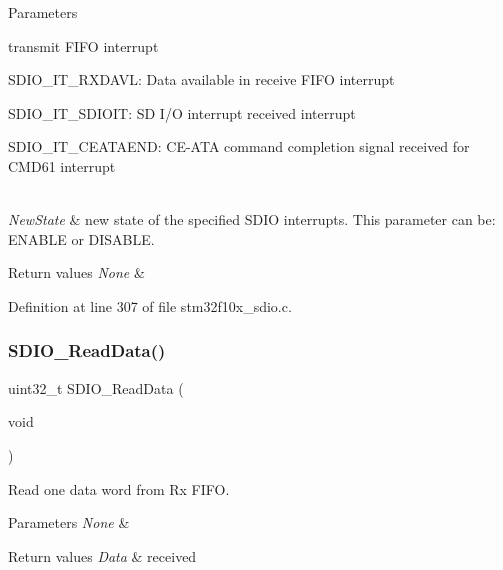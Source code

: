 \begin{DoxyParams}{Parameters}
\begin{DoxyItemize}
transmit F\+I\+FO interrupt \item S\+D\+I\+O\+\_\+\+I\+T\+\_\+\+R\+X\+D\+A\+VL\+: Data available in receive F\+I\+FO interrupt \item S\+D\+I\+O\+\_\+\+I\+T\+\_\+\+S\+D\+I\+O\+IT\+: SD I/O interrupt received interrupt \item S\+D\+I\+O\+\_\+\+I\+T\+\_\+\+C\+E\+A\+T\+A\+E\+ND\+: C\+E-\/\+A\+TA command completion signal received for C\+M\+D61 interrupt \end{DoxyItemize}
\\
\hline
{\em New\+State} & new state of the specified S\+D\+IO interrupts. This parameter can be\+: E\+N\+A\+B\+LE or D\+I\+S\+A\+B\+LE. \\
\hline
\end{DoxyParams}

\begin{DoxyRetVals}{Return values}
{\em None} & \\
\hline
\end{DoxyRetVals}


Definition at line 307 of file stm32f10x\+\_\+sdio.\+c.

\mbox{\label{group___s_d_i_o___exported___functions_ga4e8ac755ef3c31ecd4ed2708df19187e}} 
\subsubsection{\texorpdfstring{S\+D\+I\+O\+\_\+\+Read\+Data()}{SDIO\_ReadData()}}
{\footnotesize\ttfamily uint32\+\_\+t S\+D\+I\+O\+\_\+\+Read\+Data (\begin{DoxyParamCaption}\item[{void}]{ }\end{DoxyParamCaption})}



Read one data word from Rx F\+I\+FO. 


\begin{DoxyParams}{Parameters}
{\em None} & \\
\hline
\end{DoxyParams}

\begin{DoxyRetVals}{Return values}
{\em Data} & received \\
\hline
\end{DoxyRetVals}


